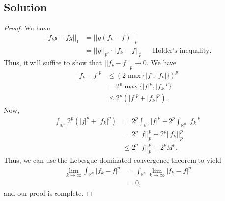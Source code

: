 \documentclass[10pt,a4paper]{article}
\theoremstyle{theorem}
\theoremstyle{definition}
\begin{document}
\subsection*{Solution}
\begin{proof}
We have
\begin{align*}
||f_k g - f g ||_1 &= ||g(f_k - f)||_p\\
&= ||g||_{p'} \cdot ||f_k - f||_p &&\text{Holder's inequality.}
\end{align*}
Thus, it will suffice to show that $||f_k - f||_p \to 0$. We have
\begin{align*}
|f_k - f|^p &\leq (2 \max\{|f|, |f_k|\})^p\\
&= 2^p \max\{|f|^p, |f_k|^p\}\\
&\leq 2^p (|f|^p + |f_k|^p).
\end{align*}
Now, 
\begin{align*}
\int_{\mathbb{R}^n} 2^p (|f|^p + |f_k|^p) &= 2^p \int_{\mathbb{R}^n}|f|^p + 2^p \int_{\mathbb{R}^n}|f_k|^p\\
&= 2^p ||f||_p^p + 2^p ||f_k||_p^p\\
&\leq 2^p ||f||_p^p + 2^p M^p.
\end{align*}
Thus, we can use the Lebesgue dominated convergence theorem to yield
\begin{align*}
\lim_{k \to \infty} \int_{\mathbb{R}^n} |f_k - f|^p &= \int_{\mathbb{R}^n} \lim_{k \to \infty} |f_k - f|^p\\
&= 0,
\end{align*}
and our proof is complete.
\end{proof}
\end{document}
